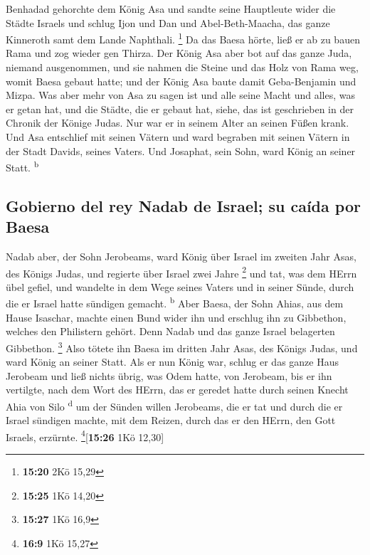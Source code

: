 Benhadad gehorchte dem König Asa und sandte seine
Hauptleute wider die Städte Israels und schlug Ijon und Dan und
Abel-Beth-Maacha, das ganze Kinneroth samt dem Lande Naphthali.
\footnote{\textbf{15:20} 2Kö 15,29}  Da das Baesa hörte,
ließ er ab zu bauen Rama und zog wieder gen Thirza.  Der
König Asa aber bot auf das ganze Juda, niemand ausgenommen, und sie
nahmen die Steine und das Holz von Rama weg, womit Baesa gebaut hatte;
und der König Asa baute damit Geba-Benjamin und Mizpa. 
Was aber mehr von Asa zu sagen ist und alle seine Macht und alles, was
er getan hat, und die Städte, die er gebaut hat, siehe, das ist
geschrieben in der Chronik der Könige Judas. Nur war er in seinem Alter
an seinen Füßen krank.  Und Asa entschlief mit seinen
Vätern und ward begraben mit seinen Vätern in der Stadt Davids, seines
Vaters. Und Josaphat, sein Sohn, ward König an seiner Statt.
\textsuperscript{b}

\hypertarget{gobierno-del-rey-nadab-de-israel-su-cauxedda-por-baesa}{%
\subsection{Gobierno del rey Nadab de Israel; su caída por
Baesa}\label{gobierno-del-rey-nadab-de-israel-su-cauxedda-por-baesa}}

 Nadab aber, der Sohn Jerobeams, ward König über Israel
im zweiten Jahr Asas, des Königs Judas, und regierte über Israel zwei
Jahre \footnote{\textbf{15:25} 1Kö 14,20}  und tat, was
dem HErrn übel gefiel, und wandelte in dem Wege seines Vaters und in
seiner Sünde, durch die er Israel hatte sündigen gemacht.
\textsuperscript{b}  Aber Baesa, der Sohn Ahias, aus dem
Hause Isaschar, machte einen Bund wider ihn und erschlug ihn zu
Gibbethon, welches den Philistern gehört. Denn Nadab und das ganze
Israel belagerten Gibbethon. \footnote{\textbf{15:27} 1Kö 16,9}
 Also tötete ihn Baesa im dritten Jahr Asas, des Königs
Judas, und ward König an seiner Statt.  Als er nun König
war, schlug er das ganze Haus Jerobeam und ließ nichts übrig, was Odem
hatte, von Jerobeam, bis er ihn vertilgte, nach dem Wort des HErrn, das
er geredet hatte durch seinen Knecht Ahia von Silo \textsuperscript{d}
 um der Sünden willen Jerobeams, die er tat und durch die
er Israel sündigen machte, mit dem Reizen, durch das er den HErrn, den
Gott Israels, erzürnte. \footnote{\textbf{16:9} 1Kö 15,27}{[}\textbf{15:26}
1Kö 12,30{]}


